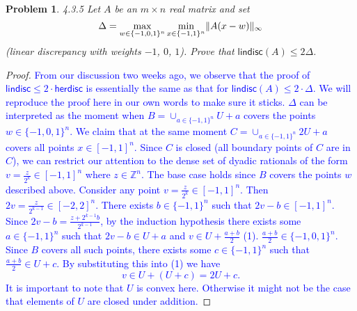 \documentclass[11pt]{article}
\def\Z{\mathbb{Z}}
\newcommand\disc{\mathsf{disc}}
\newcommand\lindisc{\mathsf{lindisc}}
\newcommand\herdisc{\mathsf{herdisc}}
\newtheorem{problem}{Problem}
\DeclarePairedDelimiter\anglebrac{\langle}{\rangle}
\DeclarePairedDelimiter\norm{\parallel}{\parallel}
\begin{document}
\begin{problem}
4.3.5 Let $A$ be an $m \times n$ real matrix and set
\[\Delta = \max_{w \in \{-1,0,1\}^n}\min_{x \in \{-1, 1\}^n} \norm{A(x - w)}_{\infty}\]
(\emph{linear discrepancy with weights $-1$, $0$, $1$}). Prove that $\lindisc(A) \leq 2\Delta$.
\end{problem}
\begin{proof}
\begin{comment}
We will show that $\Delta \geq \herdisc(A)$. Then by Theorem 4.6 in the book ($\lindisc(A) \leq 2\cdot \herdisc(A)$), we have that $\lindisc(A) \leq 2\Delta$. First observe that $\Delta \geq \disc(A)$ since $\disc(A) = \min_{x \in \{-1, 1\}^n} \norm{A(x - \mathbf{0})}_{\infty}$ where $\mathbf{0}$ is the zero vector. Next consider $A'$ which consists of a subset of the columns of $A$; this is equivalent to restricting the set system to a subset of the universe $X$. Observe that the colorings $\chi$ forms a bijection with the $n$-dimensional vectors $x$. Let $x = \anglebrac{x_1, x_2, ..., x_n}$. Suppose we wish to restrict to the columns $c_1, c_2,..., c_k$. If we take $w = \anglebrac{w_1, w_2, ..., w_n}$ where $w_{c_i} = 0$ and $w_j = -x_j$, then we have such a restriction. Thus $\Delta \geq \disc(A')$. Since $\Delta$ is greater than or equal to all restrictions of the universe $X$, $\Delta \geq \herdisc(A)$ as required. 
\end{comment}
\textcolor{blue}{From our discussion two weeks ago, we observe that the proof of $\lindisc \leq 2\cdot \herdisc$ is essentially the same as that for $\lindisc(A) \leq 2\cdot \Delta$. We will reproduce the proof here in our own words to make sure it sticks. $\Delta$ can be interpreted as the moment when $B = \cup_{a \in \{-1,1\}^n} U+a$ covers the points $w \in \{-1,0,1\}^n$. We claim that at the same moment $C = \cup_{a \in \{-1,1\}^n} 2U+a$ covers all points $x \in [-1,1]^n$. Since $C$ is closed (all boundary points of $C$ are in $C$), we can restrict our attention to the dense set of dyadic rationals of the form $v = \frac{z}{2^k} \in [-1,1]^n$ where $z \in \Z^n$. The base case holds since $B$ covers the points $w$ described above. Consider any point $v = \frac{z}{2^k} \in [-1,1]^n$. Then $2v = \frac{z}{2^{k-1}} \in [-2,2]^n$. There exists $b \in \{-1,1\}^n$ such that $2v-b \in [-1,1]^n$. Since $2v - b = \frac{z + 2^{k-1}b}{2^{k-1}}$, by the induction hypothesis there exists some $a \in \{-1,1\}^n$ such that $2v - b \in U + a$ and $v \in U + \frac{a+b}{2}$ (1). $\frac{a+b}{2} \in \{-1,0,1\}^n$. Since $B$ covers all such points, there exists some $c \in \{-1,1\}^n$ such that $\frac{a+b}{2} \in U + c$. By substituting this into (1) we have
\[v \in U + (U + c) = 2U + c.\]
It is important to note that $U$ is convex here. Otherwise it might not be the case that elements of $U$ are closed under addition.}
\end{proof}
\end{document}
